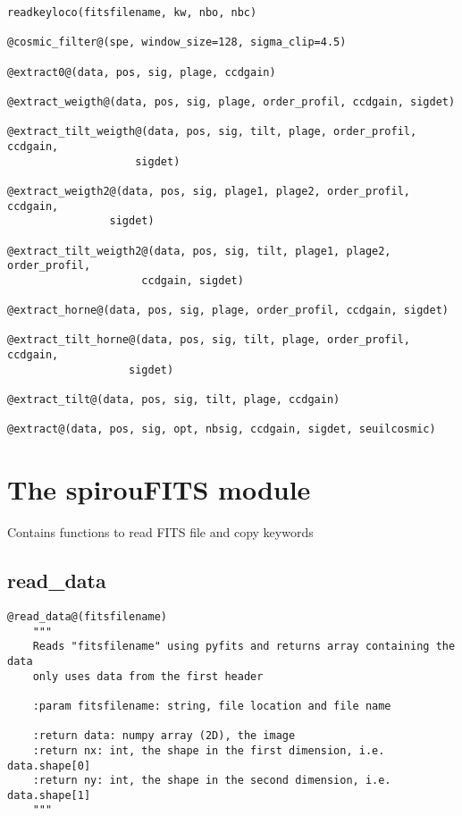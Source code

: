 \begin{lstlisting}[style=pythonstyle]
readkeyloco(fitsfilename, kw, nbo, nbc)

@cosmic_filter@(spe, window_size=128, sigma_clip=4.5)

@extract0@(data, pos, sig, plage, ccdgain)

@extract_weigth@(data, pos, sig, plage, order_profil, ccdgain, sigdet)

@extract_tilt_weigth@(data, pos, sig, tilt, plage, order_profil, ccdgain,
                    sigdet)

@extract_weigth2@(data, pos, sig, plage1, plage2, order_profil, ccdgain,
                sigdet)

@extract_tilt_weigth2@(data, pos, sig, tilt, plage1, plage2, order_profil,
                     ccdgain, sigdet)

@extract_horne@(data, pos, sig, plage, order_profil, ccdgain, sigdet)

@extract_tilt_horne@(data, pos, sig, tilt, plage, order_profil, ccdgain,
                   sigdet)

@extract_tilt@(data, pos, sig, tilt, plage, ccdgain)

@extract@(data, pos, sig, opt, nbsig, ccdgain, sigdet, seuilcosmic)
\end{lstlisting}

\clearpage
\newpage
\section{The spirouFITS module}

Contains functions to read FITS file and copy keywords

\subsection{read\_data}
\begin{lstlisting}[style=pythonstyle]
@read_data@(fitsfilename)
    """
    Reads "fitsfilename" using pyfits and returns array containing the data
    only uses data from the first header

    :param fitsfilename: string, file location and file name

    :return data: numpy array (2D), the image
    :return nx: int, the shape in the first dimension, i.e. data.shape[0]
    :return ny: int, the shape in the second dimension, i.e. data.shape[1]
    """
\end{lstlisting}

